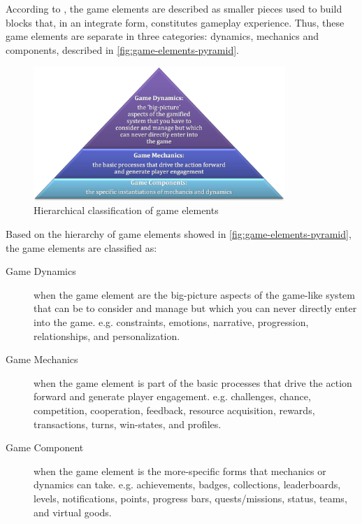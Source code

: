 According to , the game elements are described as smaller pieces used to build blocks that, in an integrate form, constitutes gameplay experience. Thus, these game elements are separate in three categories: dynamics, mechanics and components, described in \autoref{fig:game-elements-pyramid}.

\begin{figure}[htb]
 \caption{Hierarchical classification of game elements}
 \label{fig:game-elements-pyramid}
 \centering
 \includegraphics[width=0.85\textwidth]{images/chap-general-background/game-elements-pyramid.png}
\end{figure}

Based on the hierarchy of game elements showed in \autoref{fig:game-elements-pyramid}, the game elements are classified as:
\begin{description}
\item[Game Dynamics] when the game element are the big-picture aspects of the game-like system that can be to consider and manage but which you can never directly enter into the game. e.g. constraints, emotions, narrative, progression, relationships, and personalization.
\item[Game Mechanics] when the game element is part of the basic processes that drive the action forward and generate player engagement. e.g. challenges, chance, competition, cooperation, feedback, resource acquisition, rewards, transactions, turns, win-states, and profiles.
\item[Game Component] when the game element is the more-specific forms that mechanics or dynamics can take. e.g. achievements, badges, collections, leaderboards, levels, notifications, points, progress bars, quests/missions, status, teams, and virtual goods.
\end{description}

